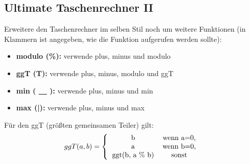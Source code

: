 \subsection{Ultimate Taschenrechner II }
Erweitere den Taschenrechner im selben Stil noch um weitere Funktionen (in Klammern ist angegeben, wie die Funktion aufgerufen werden sollte):
\begin{itemize}
	\item \textbf{\textcolor[rgb]{0,0.5,1}{modulo (\%):}} verwende plus, minus und modulo
	\item \textbf{\textcolor[rgb]{0,0.5,1}{ggT (T):}} verwende plus, minus, modulo und ggT
	\item \textbf{\textcolor[rgb]{0,0.5,1}{min ( \underline{\ \ } ):}} verwende plus, minus und min
	\item \textbf{\textcolor[rgb]{0,0.5,1}{max (|):}} verwende plus, minus und max
\end{itemize}
Für den ggT (größten gemeinsamen Teiler) gilt:
$$ggT(a,b)=\left\{\begin{tabular}{cc}b&wenn a=0,\\a&wenn b=0,\\ggt(b, a \% b)&sonst\end{tabular}\right.$$